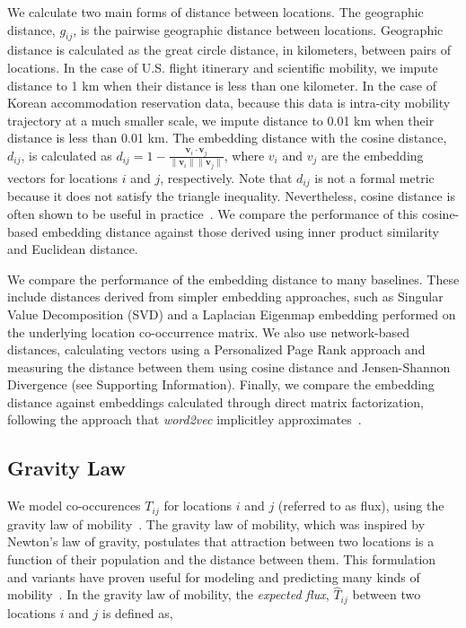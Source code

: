 \documentclass[12pt]{article} %
\def\SI{Supporting Information}
\begin{document}
We calculate two main forms of distance between locations.
The geographic distance, $g_{ij}$, is the pairwise geographic distance between locations.
Geographic distance is calculated as the great circle distance, in kilometers, between pairs of locations.
In the case of U.S. flight itinerary and scientific mobility, we impute distance to 1 km when their distance is less than one kilometer.
In the case of Korean accommodation reservation data, because this data is intra-city mobility trajectory at a much smaller scale, we impute distance to 0.01 km when their distance is less than 0.01 km.
The embedding distance with the cosine distance, $d_{ij}$, is calculated as $d_{ij} = 1 - \frac{\bm{v}_{i} \cdot \bm{v}_{j}}{\lVert \bm{v}_{i} \rVert \lVert \bm{v}_{j} \rVert}$,
where $v_i$ and $v_j$ are the embedding vectors for locations $i$ and $j$, respectively.
Note that $d_{ij}$ is not a formal metric because it does not satisfy the triangle inequality.
Nevertheless, cosine distance is often shown to be useful in practice~\autocite{lerman2007embedding, brown1970migration, kim2018functional}.
We compare the performance of this cosine-based embedding distance against those derived using inner product similarity and Euclidean distance.

We compare the performance of the embedding distance to many baselines.
These include distances derived from simpler embedding approaches, such as Singular Value Decomposition (SVD) and a Laplacian Eigenmap embedding performed on the underlying location co-occurrence matrix.
We also use network-based distances, calculating vectors using a Personalized Page Rank approach and measuring the distance between them using cosine distance and Jensen-Shannon Divergence (see \SI).
Finally, we compare the embedding distance against embeddings calculated through direct matrix factorization, following the approach that \textit{word2vec} implicitley approximates~\autocite{levy2014neural}.


%
%
\subsection*{Gravity Law}

We model co-occurences $T_{ij}$ for locations $i$ and $j$ (referred to as flux), using the gravity law of mobility~\autocite{zipf1946gravity}.
The gravity law of mobility, which was inspired by Newton's law of gravity, postulates that attraction between two locations is a function of their population and the distance between them.
This formulation and variants have proven useful for modeling and predicting many kinds of mobility~\autocite{jung2008highwaygravity, curiel2018citygravity, truscott2012epidemicgravity, hong2016busgravity}.
In the gravity law of mobility, the \textit{expected flux}, $\hat{T}_{ij}$ between two locations $i$ and $j$ is defined as,
\end{document}
